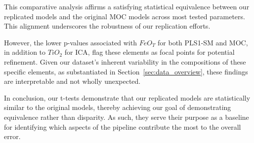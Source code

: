 This comparative analysis affirms a satisfying statistical equivalence between our replicated models and the original MOC models across most tested parameters.
This alignment underscores the robustness of our replication efforts.

However, the lower p-values associated with $FeO_T$ for both PLS1-SM and MOC, in addition to $TiO_2$ for ICA, flag these elements as focal points for potential refinement.
Given our dataset's inherent variability in the compositions of these specific elements, as substantiated in Section~\ref{sec:data_overview}, these findings are interpretable and not wholly unexpected.

In conclusion, our t-tests demonstrate that our replicated models are statistically similar to the original models, thereby achieving our goal of demonstrating equivalence rather than disparity.
As such, they serve their purpose as a baseline for identifying which aspects of the pipeline contribute the most to the overall error.






